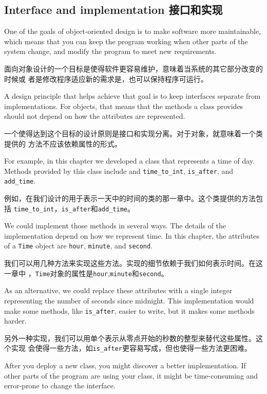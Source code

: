 \documentclass[10pt]{book}
\begin{document}
\begin{CJK}{UTF8}{gbsn}
\section{Interface and implementation 接口和实现}

One of the goals of object-oriented design is to make software more
maintainable, which means that you can keep the program working when
other parts of the system change, and modify the program to meet new
requirements.

面向对象设计的一个目标是使得软件更容易维护，意味着当系统的其它部分改变的时候或
者是修改程序适应新的需求是，也可以保持程序可运行。

A design principle that helps achieve that goal is to keep
interfaces separate from implementations.  For objects, that means
that the methods a class provides should not depend on how the
attributes are represented.

一个使得达到这个目标的设计原则是接口和实现分离。对于对象，就意味着一个类提供的
方法不应该依赖属性的形式。

For example, in this chapter we developed a class that represents
a time of day.  Methods provided by this class include
and \verb"time_to_int", \verb"is_after", and \verb"add_time".

例如，在我们设计的用于表示一天中的时间的类的那一章中。这个类提供的方法包括
\verb"time_to_int"，\verb"is_after"和\verb"add_time"。

We could implement those methods in several ways.  The details of the
implementation depend on how we represent time.  In this chapter, the
attributes of a {\tt Time} object are {\tt hour}, {\tt minute}, and
{\tt second}.

我们可以用几种方法来实现这些方法。实现的细节依赖于我们如何表示时间。在这一章中
，{\tt Time}对象的属性是{\tt hour},{\tt minute}和{\tt second}。

As an alternative, we could replace these attributes with
a single integer representing the number of seconds
since midnight.  This implementation would make some methods,
like \verb"is_after", easier to write, but it makes some methods
harder.

另外一种实现，我们可以用单个表示从零点开始的秒数的整型来替代这些属性。这个实现
会使得一些方法，如\verb"is_after"更容易写成，但也使得一些方法更困难。

After you deploy a new class, you might discover a better
implementation.  If other parts of the program are using your
class, it might be time-consuming and error-prone to change the
interface.  


\end{CJK}
\end{document}
